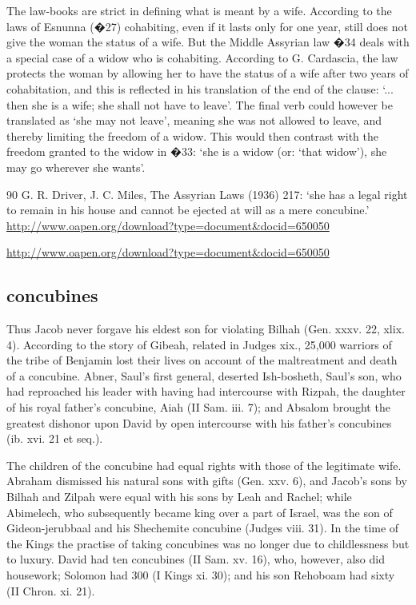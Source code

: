 \documentclass[11pt]{article}
\begin{document}
\begin{thebibliography}{56}
The law-books are strict in defining what is meant by a wife. According to the
laws of Esnunna (�27) cohabiting, even if it lasts only for one year, still does not give the woman the status of a wife. But the Middle Assyrian law �34 deals with
a special case of a widow who is cohabiting. According to G. Cardascia, the law
protects the woman by allowing her to have the status of a wife after two years
of cohabitation, and this is reflected in his translation of the end of the clause:
`... then she is a wife; she shall not have to leave'. The final verb could however
be translated as `she may not leave', meaning she was not allowed to leave,
and thereby limiting the freedom of a widow. This would then contrast with the
freedom granted to the widow in �33: `she is a widow (or: `that widow'), she may
go wherever she wants'.

90 G. R. Driver, J. C. Miles, The Assyrian Laws (1936) 217: ‘she has a legal right to remain in his
house and cannot be ejected at will as a mere concubine.’
\url{http://www.oapen.org/download?type=document&docid=650050}


\url{http://www.oapen.org/download?type=document&docid=650050}




\end{thebibliography}









\subsection{concubines}
Thus Jacob never forgave his eldest son for violating Bilhah (Gen. xxxv. 22, xlix. 4). According to the story of Gibeah, related in Judges xix., 25,000 warriors of the tribe of Benjamin lost their lives on account of the maltreatment and death of a concubine. Abner, Saul's first general, deserted Ish-bosheth, Saul's son, who had reproached his leader with having had intercourse with Rizpah, the daughter of his royal father's concubine, Aiah (II Sam. iii. 7); and Absalom brought the greatest dishonor upon David by open intercourse with his father's concubines (ib. xvi. 21 et seq.).

The children of the concubine had equal rights with those of the legitimate wife. Abraham dismissed his natural sons with gifts (Gen. xxv. 6), and Jacob's sons by Bilhah and Zilpah were equal with his sons by Leah and Rachel; while Abimelech, who subsequently became king over a part of Israel, was the son of Gideon-jerubbaal and his Shechemite concubine (Judges viii. 31). In the time of the Kings the practise of taking concubines was no longer due to childlessness but to luxury. David had ten concubines (II Sam. xv. 16), who, however, also did housework; Solomon had 300 (I Kings xi. 30); and his son Rehoboam had sixty (II Chron. xi. 21).
\end{document}
